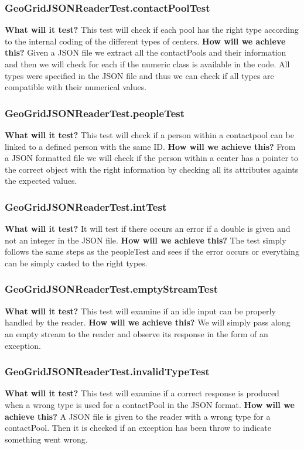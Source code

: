 \documentclass{article}
\begin{document}
\subsubsection{GeoGridJSONReaderTest.contactPoolTest}
\textbf{What will it test?}
This test will check if each pool has the right type according to the internal coding of the different types of centers.
\newline
\textbf{How will we achieve this?}
Given a JSON file we extract all the contactPools and their information and then we will check for each if the numeric class is available in the code. All types were specified in the JSON file and thus we can check if all types are compatible with their numerical values.

\subsubsection{GeoGridJSONReaderTest.peopleTest}
\textbf{What will it test?}
This test will check if a person within a contactpool can be linked to a defined person with the same ID.
\newline
\textbf{How will we achieve this?}
From a JSON formatted file we will check if the person within a center has a pointer to the correct object with the right information by checking all its attributes againts the expected values.

\subsubsection{GeoGridJSONReaderTest.intTest}
\textbf{What will it test?}
It will test if there occurs an error if a double is given and not an integer in the JSON file.
\newline
\textbf{How will we achieve this?}
The test simply follows the same steps as the peopleTest and sees if the error occurs or everything can be simply casted to the right types.

\subsubsection{GeoGridJSONReaderTest.emptyStreamTest}
\textbf{What will it test?}
This test will examine if an idle input can be properly handled by the reader.
\newline
\textbf{How will we achieve this?}
We will simply pass along an empty stream to the reader and observe its response in the form of an exception.

\subsubsection{GeoGridJSONReaderTest.invalidTypeTest}
\textbf{What will it test?}
This test will examine if a correct response is produced when a wrong type is used for a contactPool in the JSON format.
\newline
\textbf{How will we achieve this?}
A JSON file is given to the reader with a wrong type for a contactPool. Then it is checked if an exception has been throw to indicate something went wrong.
\end{document}
